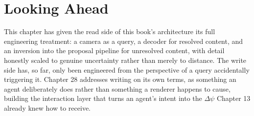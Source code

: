 \section{Looking Ahead}

This chapter has given the read side of this book's architecture its full engineering treatment: a camera as a query, a decoder for resolved content, and an inversion into the proposal pipeline for unresolved content, with detail honestly scaled to genuine uncertainty rather than merely to distance. The write side has, so far, only been engineered from the perspective of a query accidentally triggering it. Chapter 28 addresses writing on its own terms, as something an agent deliberately does rather than something a renderer happens to cause, building the interaction layer that turns an agent's intent into the \(\Delta\psi\) Chapter 13 already knew how to receive.
